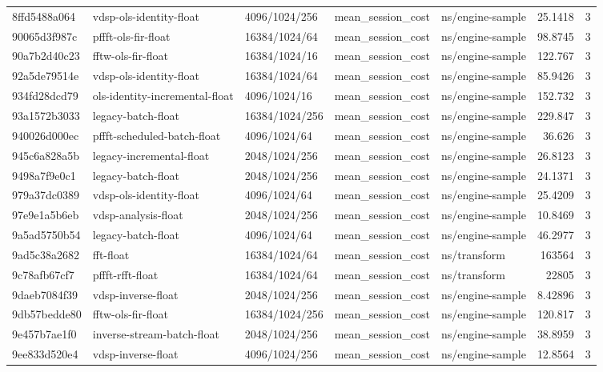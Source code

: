 \begin{longtable}{lllllrr}
8ffd5488a064 & vdsp-ols-identity-float & 4096/1024/256 & mean\_session\_cost & ns/engine-sample & 25.1418 & 3 \\
90065d3f987c & pffft-ols-fir-float & 16384/1024/64 & mean\_session\_cost & ns/engine-sample & 98.8745 & 3 \\
90a7b2d40c23 & fftw-ols-fir-float & 16384/1024/16 & mean\_session\_cost & ns/engine-sample & 122.767 & 3 \\
92a5de79514e & vdsp-ols-identity-float & 16384/1024/64 & mean\_session\_cost & ns/engine-sample & 85.9426 & 3 \\
934fd28dcd79 & ols-identity-incremental-float & 4096/1024/16 & mean\_session\_cost & ns/engine-sample & 152.732 & 3 \\
93a1572b3033 & legacy-batch-float & 16384/1024/256 & mean\_session\_cost & ns/engine-sample & 229.847 & 3 \\
940026d000ec & pffft-scheduled-batch-float & 4096/1024/64 & mean\_session\_cost & ns/engine-sample & 36.626 & 3 \\
945c6a828a5b & legacy-incremental-float & 2048/1024/256 & mean\_session\_cost & ns/engine-sample & 26.8123 & 3 \\
9498a7f9e0c1 & legacy-batch-float & 2048/1024/256 & mean\_session\_cost & ns/engine-sample & 24.1371 & 3 \\
979a37dc0389 & vdsp-ols-identity-float & 4096/1024/64 & mean\_session\_cost & ns/engine-sample & 25.4209 & 3 \\
97e9e1a5b6eb & vdsp-analysis-float & 2048/1024/256 & mean\_session\_cost & ns/engine-sample & 10.8469 & 3 \\
9a5ad5750b54 & legacy-batch-float & 4096/1024/64 & mean\_session\_cost & ns/engine-sample & 46.2977 & 3 \\
9ad5c38a2682 & fft-float & 16384/1024/64 & mean\_session\_cost & ns/transform & 163564 & 3 \\
9c78afb67cf7 & pffft-rfft-float & 16384/1024/64 & mean\_session\_cost & ns/transform & 22805 & 3 \\
9daeb7084f39 & vdsp-inverse-float & 2048/1024/256 & mean\_session\_cost & ns/engine-sample & 8.42896 & 3 \\
9db57bedde80 & fftw-ols-fir-float & 16384/1024/256 & mean\_session\_cost & ns/engine-sample & 120.817 & 3 \\
9e457b7ae1f0 & inverse-stream-batch-float & 2048/1024/256 & mean\_session\_cost & ns/engine-sample & 38.8959 & 3 \\
9ee833d520e4 & vdsp-inverse-float & 4096/1024/256 & mean\_session\_cost & ns/engine-sample & 12.8564 & 3 \\

\end{longtable}
